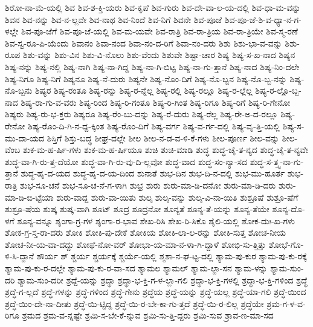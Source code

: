{ಶಿರೋ-ನಾ-ಮೆ-ಯಲ್ಲಿ
ಶಿವ
ಶಿವ-ಶ-ಕ್ತಿ-ಯರು
ಶಿವ-ಕೃಪೆ
ಶಿವ-ಗುರು
ಶಿವ-ದೇ-ವಾ-ಲ-ಯ-ದಲ್ಲಿ
ಶಿವ-ಧಾ-ಮ-ವನ್ನು
ಶಿವನ
ಶಿವ-ನನ್ನು
ಶಿವ-ನ-ಲ್ಲವೇ
ಶಿವ-ನಾಥ
ಶಿವ-ನಿಂದೆ
ಶಿವ-ನಿಗೆ
ಶಿವನೇ
ಶಿವ-ಪೂಜೆ
ಶಿವ-ಪೂ-ಜೆ-ಶಿ-ವ-ಧ್ಯಾ-ನ-ಗ-ಳಲ್ಲೇ
ಶಿವ-ಪೂ-ಜೆಗೆ
ಶಿವ-ಪೂ-ಜೆ-ಯಲ್ಲಿ
ಶಿವ-ಮ-ಯವೇ
ಶಿವ-ರಾತ್ರಿ
ಶಿವ-ರಾ-ತ್ರಿಯ
ಶಿವ-ರಾ-ತ್ರಿಯೇ
ಶಿವ-ಸ್ಮ-ರಣೆ
ಶಿವ-ಸ್ವ-ರೂ-ಪಿ-ಯೆಂದು
ಶಿವಾನಂ
ಶಿವಾ-ನಂದ
ಶಿವಾ-ನಂ-ದ-ರಿಗೆ
ಶಿವಾ-ನಂ-ದರು
ಶಿಶು
ಶಿಶು-ಭಾ-ವ-ವನ್ನು
ಶಿಶು-ರೂಪ
ಶಿಶು-ವನ್ನು
ಶಿಶು-ವಿನ
ಶಿಶು-ವಿ-ನೊಲು
ಶಿಶು-ವೆಂದು
ಶಿಶುವೇ
ಶಿಷ್ಟಾ-ಚಾರ
ಶಿಷ್ಯ
ಶಿಷ್ಯ-ಸ-ಖ-ನಾದ
ಶಿಷ್ಯನ
ಶಿಷ್ಯ-ನನ್ನು
ಶಿಷ್ಯ-ನಲ್ಲಿ
ಶಿಷ್ಯ-ನಾಗಿ
ಶಿಷ್ಯ-ನಾ-ಗಿದ್ದ
ಶಿಷ್ಯ-ನಾ-ಗಿ-ಬಿಟ್ಟ
ಶಿಷ್ಯ-ನಾ-ಗು-ತ್ತಾನೆ
ಶಿಷ್ಯ-ನಾದ
ಶಿಷ್ಯ-ನಿಂ-ದಲೇ
ಶಿಷ್ಯ-ನಿಗೂ
ಶಿಷ್ಯ-ನಿಗೆ
ಶಿಷ್ಯನೂ
ಶಿಷ್ಯ-ನೆ-ದುರು
ಶಿಷ್ಯನೇ
ಶಿಷ್ಯ-ನೊಂ-ದಿಗೆ
ಶಿಷ್ಯ-ನೊ-ಬ್ಬನ
ಶಿಷ್ಯ-ನೊ-ಬ್ಬ-ನನ್ನು
ಶಿಷ್ಯ-ನೊ-ಬ್ಬನು
ಶಿಷ್ಯರ
ಶಿಷ್ಯ-ರಂತೂ
ಶಿಷ್ಯ-ರನ್ನು
ಶಿಷ್ಯ-ರ-ನ್ನೆಲ್ಲ
ಶಿಷ್ಯ-ರಲ್ಲಿ
ಶಿಷ್ಯ-ರಲ್ಲೂ
ಶಿಷ್ಯ-ರ-ಲ್ಲೆಲ್ಲ
ಶಿಷ್ಯ-ರ-ಲ್ಲೊ-ಬ್ಬ-ನಾದ
ಶಿಷ್ಯ-ರಾ-ಗು-ವ-ವರು
ಶಿಷ್ಯ-ರಿಂದ
ಶಿಷ್ಯ-ರಿ-ಗಂತೂ
ಶಿಷ್ಯ-ರಿ-ಗಿಂತ
ಶಿಷ್ಯ-ರಿಗೂ
ಶಿಷ್ಯ-ರಿಗೆ
ಶಿಷ್ಯ-ರಿ-ಗೇನೋ
ಶಿಷ್ಯರು
ಶಿಷ್ಯ-ರು-ಭ-ಕ್ತರು
ಶಿಷ್ಯರೂ
ಶಿಷ್ಯ-ರೆಂ-ಬು-ದನ್ನು
ಶಿಷ್ಯ-ರೆ-ದುರು
ಶಿಷ್ಯ-ರೆಲ್ಲ
ಶಿಷ್ಯ-ರೇ-ಅ-ದ-ರಲ್ಲೂ
ಶಿಷ್ಯ-ರೇನೋ
ಶಿಷ್ಯ-ರೊಂ-ದಿ-ಗಿ-ನ-ದ್ದ-ಕ್ಕಿಂತ
ಶಿಷ್ಯ-ರೊಂ-ದಿಗೆ
ಶಿಷ್ಯ-ವರ್ಗ
ಶಿಷ್ಯ-ವ-ರ್ಗ-ದಲ್ಲಿ
ಶಿಷ್ಯ-ವೃ-ತ್ತಿ-ಯಲ್ಲಿ
ಶಿಷ್ಯ-ಸ-ಮು-ದಾ-ಯದ
ಶಿಸ್ತಿಗೆ
ಶಿಸ್ತು-ಬದ್ಧ
ಶೀಘ್ರ-ದಲ್ಲೇ
ಶೀಲ
ಶೀಲ-ನ-ಡ-ವ-ಳಿ-ಕೆ-ಗಳು
ಶೀಲ-ಪೂರ್ಣ
ಶೀಲ-ವನ್ನು
ಶೀಲ-ವೆಂಬ
ಶುಕ-ಮ-ಹ-ರ್ಷಿ-ಗಳು
ಶುಕ-ಮ-ಹ-ರ್ಷಿಯೂ
ಶುಚಿ
ಶುಚಿ-ಮಾಡಿ
ಶುದ್ಧ
ಶುದ್ಧ-ಚೈ-ತ-ನ್ಯದ
ಶುದ್ಧ-ಚೈ-ತ-ನ್ಯವೇ
ಶುದ್ಧ-ವಾ-ಗಿ-ರು-ತ್ತ-ದೆಯೋ
ಶುದ್ಧ-ವಾ-ಗಿ-ರು-ವು-ದಿ-ಲ್ಲವೋ
ಶುದ್ಧ-ವಾದ
ಶುದ್ಧ-ಸಂ-ನ್ಯಾ-ಸದ
ಶುದ್ಧ-ಸ-ತ್ತ್ವ-ನಾ-ಗು-ತ್ತಾನೆ
ಶುದ್ಧ-ಹೃ-ದ-ಯದ
ಶುದ್ಧ-ಹೃ-ದ-ಯ-ದಿಂದ
ಶುನಾತೆ
ಶುಭ-ದಿನ
ಶುಭ-ದಿ-ನ-ದಲ್ಲಿ
ಶುಭ-ಮು-ಹೂರ್ತ
ಶುಭ-ರಾತ್ರಿ
ಶುಭ-ಸೂ-ಚನೆ
ಶುಭ-ಸೂ-ಚ-ನೆ-ಗ-ಳಾಗಿ
ಶುಭ್ರ
ಶುರು
ಶುರು-ಮಾ-ಡಿ-ದನೋ
ಶುರು-ಮಾ-ಡಿ-ದರು
ಶುರು-ಮಾ-ಡಿ-ಬಿ-ಟ್ಟೆಯಾ
ಶುರು-ವಾದ್ದ
ಶುರು-ವಾ-ಯಿತು
ಶುಲ್ಕ
ಶುಲ್ಕ-ವನ್ನು
ಶುಲ್ಕ-ವಿ-ನಾ-ಯಿತಿ
ಶುಶ್ರೂಷೆ
ಶುಶ್ರೂ-ಷೆಗೆ
ಶುಶ್ರೂ-ಷೆಯ
ಶುಷ್ಕ
ಶುಷ್ಕ-ವಾಗಿ
ಶೂಟ್
ಶೂದ್ರ
ಶೂದ್ರನೋ
ಶೂನ್ಯತೆ
ಶೂನ್ಯ-ತೆ-ಯನ್ನು
ಶೂನ್ಯ-ತೆಯೇ
ಶೂನ್ಯ-ದೊ-ಳಗೆ
ಶೂನ್ಯ-ವನ್ನೂ
ಶೃಂಗಾ-ಗ್ರ-ಗಳ
ಶೃಂಗಾ-ರ-ಭಾವ
ಶೇಖ-ರಿಸಿ
ಶೇಖ-ರಿ-ಸಿಕೊ
ಶೈಲಿ-ಯಲ್ಲಿ
ಶೋಕ-ದುಃ-ಖ-ಗಳು
ಶೋಕ-ಗ್ರ-ಸ್ತ-ರಾ-ದರು
ಶೋಕಿ
ಶೋಕಿ-ಪು-ದೇಕೆ
ಶೋಕಿಯ
ಶೋಕಿ-ಲಾ-ಲ-ರನ್ನು
ಶೋಕಿ-ಸುತ್ತ
ಶೋಚ-ನೀಯ
ಶೋಚ-ನೀ-ಯ-ವಾ-ದದ್ದು
ಶೋಫೆ-ನೋ-ವರ್
ಶೋಭಾ-ಯ-ಮಾ-ನ-ಳಾ-ಗಿ-ದ್ದಾಳೆ
ಶೋಭಿ-ಸು-ತ್ತಿತ್ತು
ಶೋಭೆ-ಗೊ-ಳಿ-ಸಿ-ದ್ದಾನೆ
ಶೌರ್ಯ
ಶ್
ಶ್ಚರ್ಯ
ಶ್ಚರ್ಯಕ್ಕೆ
ಶ್ಚರ್ಯೆ-ಯಲ್ಲಿ
ಶ್ಮಶಾ-ನ-ಘ-ಟ್ಟ-ದಲ್ಲಿ
ಶ್ಯಾಮ-ಪು-ಕುರ
ಶ್ಯಾಮ-ಪು-ಕು-ರಕ್ಕೆ
ಶ್ಯಾಮ-ಪು-ಕು-ರ-ದಲ್ಲೇ
ಶ್ಯಾಮ-ಪು-ಕು-ರ-ವಾ-ಸದ
ಶ್ಯಾಮಲ
ಶ್ಯಾಮಲ್
ಶ್ಯಾಮ-ಲ್ದಾ-ಸನ
ಶ್ಯಾಮ-ಳನ್ನು
ಶ್ಯಾಮ-ಸುಂ-ದರಿ
ಶ್ಯಾಮ-ಸುಂ-ದರೀ
ಶ್ರದ್ದೆ-ಯನ್ನು
ಶ್ರದ್ಧಾ
ಶ್ರದ್ಧಾ-ಭ-ಕ್ತಿ-ಗ-ಳ-ಲ್ಲಾ-ಗಲಿ
ಶ್ರದ್ಧಾ-ಭ-ಕ್ತಿ-ಗಳಲ್ಲಿ
ಶ್ರದ್ಧಾ-ಭ-ಕ್ತಿ-ಗಳಿಂದ
ಶ್ರದ್ಧೆ
ಶ್ರದ್ಧೆ-ಗ-ಲ್ಲದೆ
ಶ್ರದ್ಧೆ-ಗಳನ್ನು
ಶ್ರದ್ಧೆ-ಗಳಿಂದ
ಶ್ರದ್ಧೆ-ಗೇನು
ಶ್ರದ್ಧೆಯ
ಶ್ರದ್ಧೆ-ಯನ್ನು
ಶ್ರದ್ಧೆ-ಯಲ್ಲ
ಶ್ರದ್ಧೆ-ಯಾ-ಗಲಿ
ಶ್ರದ್ಧೆ-ಯಿಂದ
ಶ್ರದ್ಧೆ-ಯಿಂ-ದೇ-ನಾ-ದೀತು
ಶ್ರದ್ಧೆ-ಯಿ-ಟ್ಟಿದ್ದ
ಶ್ರದ್ಧೆ-ಯಿ-ರ-ಬೇ-ಕಾ-ಗು-ತ್ತದೆ
ಶ್ರದ್ಧೆ-ಯಿ-ರ-ಲಿಲ್ಲ
ಶ್ರದ್ಧೆಯೇ
ಶ್ರಮ-ಗ-ಳ-ವ-ರಿಗೂ
ಶ್ರಮದ
ಶ್ರಮ-ವ-ನ್ನಷ್ಟೇ
ಶ್ರಮಿ-ಸ-ಬೇ-ಕೆ-ನ್ನುವ
ಶ್ರಮಿ-ಸು-ತ್ತಿ-ದ್ದರು
ಶ್ರಮಿ-ಸುವ
ಶ್ರಾವ-ಣ-ಮಾ-ಸದ
}
